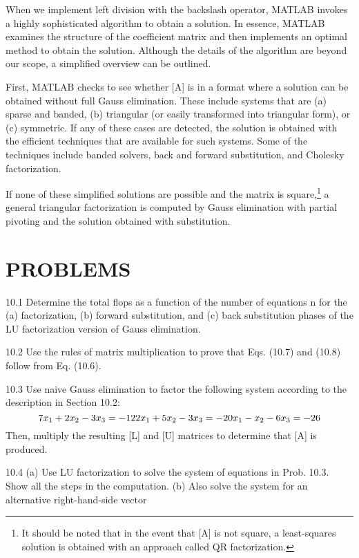 \documentclass[../main.tex]{subfiles}
\begin{document}
When we implement left division with the backslash operator, MATLAB invokes a
highly sophisticated algorithm to obtain a solution. In essence, MATLAB examines the
structure of the coefficient matrix and then implements an optimal method to obtain the
solution. Although the details of the algorithm are beyond our scope, a simplified overview can be outlined.

First, MATLAB checks to see whether [A] is in a format where a solution can be
obtained without full Gauss elimination. These include systems that are (a) sparse and
banded, (b) triangular (or easily transformed into triangular form), or (c) symmetric. If any of these cases are detected, the solution is obtained with the efficient techniques that are available for such systems. Some of the techniques include banded solvers, back and forward substitution, and Cholesky factorization.

If none of these simplified solutions are possible and the matrix is square,\footnote{It should be noted that in the event that [A] is not square, a least-squares solution is obtained with an approach called QR factorization.} a general
triangular factorization is computed by Gauss elimination with partial pivoting and the
solution obtained with substitution.

\section*{PROBLEMS}

10.1 Determine the total flops as a function of the number
of equations n for the (a) factorization, (b) forward substitution, and (c) back substitution phases of the LU factorization
version of Gauss elimination.


10.2 Use the rules of matrix multiplication to prove that
Eqs. (10.7) and (10.8) follow from Eq. (10.6).


10.3 Use naive Gauss elimination to factor the following
system according to the description in Section 10.2:
\begin{equation}
7x_{1} + 2x_{2} - 3x_{3} = -12\\
2x_{1} + 5x_{2} - 3x_{3} = -20\\
x_{1} - x_{2} - 6x_{3} = -26
\end{equation}
Then, multiply the resulting [L] and [U] matrices to determine that [A] is produced.


10.4 (a) Use LU factorization to solve the system of equations
in Prob. 10.3. Show all the steps in the computation. (b) Also
solve the system for an alternative right-hand-side vector
\end{document}
